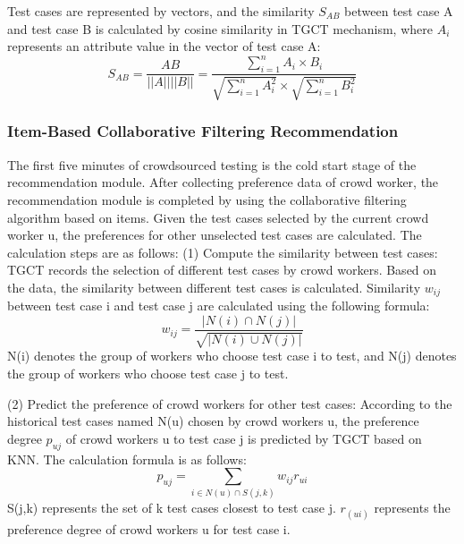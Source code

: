 Test cases are represented by vectors, and the similarity $S_{AB}$ between test case A and test case B is calculated by cosine similarity in TGCT mechanism, where $A_{i}$ represents an attribute value in the vector of test case A:
\begin{equation}
S_{AB} = \frac{AB}{||A||||B||} = \frac{\sum_{i = 1}^nA_i \times B_i}{\sqrt{\sum_{i = 1}^nA_i^{2}} \times \sqrt{\sum_{i = 1}^nB_i^{2}}}
\end{equation}

\subsubsection{Item-Based Collaborative Filtering Recommendation}
The first five minutes of crowdsourced testing is the cold start stage of the recommendation module. After collecting preference data of crowd worker, the recommendation module is completed by using the collaborative filtering algorithm based on items. Given the test cases selected by the current crowd worker u, the preferences for other unselected test cases are calculated. The calculation steps are as follows: (1) Compute the similarity between test cases: TGCT records the selection of different test cases by crowd workers. Based on the data, the similarity between different test cases is calculated. Similarity $w_{ij}$ between test case i and test case j are calculated using the following formula:
\begin{equation}
w_{ij} = \frac{|N(i) \cap N(j)|}{\sqrt{|N(i) \cup N(j)|}}
\end{equation}
N(i) denotes the group of workers who choose test case i to test, and N(j) denotes the group of workers who choose test case j to test.

(2) Predict the preference of crowd workers for other test cases: According to the historical test cases named N(u) chosen by crowd workers u, the preference degree $p_{uj}$ of crowd workers u to test case j is predicted by TGCT based on KNN. The calculation formula is as follows:
\begin{equation}
p_{uj} = \sum_{i\in N(u) \cap S(j,k)}w_{ij}r_{ui}
\end{equation}
S(j,k) represents the set of k test cases closest to test case j. $r_(ui)$ represents the preference degree of crowd workers u for test case i. 

